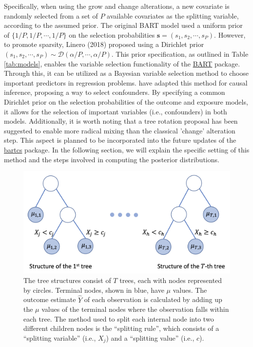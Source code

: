 Specifically, when using the grow and change alterations, a new covariate is randomly selected from a set of $P$ available covariates as the splitting variable, according to the assumed prior. The original BART model used a uniform prior of $\{1/P, 1/P, \cdots, 1/P\}$ on the selection probabilities $\boldsymbol{s} = (s_1, s_2, \cdots, s_P)$. However, to promote sparsity, Linero (2018) proposed using a Dirichlet prior $ (s_1, s_2, \cdots, s_P) \sim \mathcal{D}(\alpha/P, \cdots, \alpha/P)$. This prior specification, as outlined in Table \ref{tab:models}, enables the variable selection functionality of the \href{https://cran.r-project.org/package=BART}{BART} package. Through this, it can be utilized as a Bayesian variable selection method to choose important predictors in regression problems. \cite{kim2023bnp} have adapted this method for causal inference, proposing a way to select confounders. By specifying a common Dirichlet prior on the selection probabilities of the outcome and exposure models, it allows for the selection of important variables (i.e., confounders) in both models. Additionally, it is worth noting that a tree rotation proposal \citep{pratola2016efficient} has been suggested to enable more radical mixing than the classical 'change' alteration step. This aspect is planned to be incorporated into the future updates of the \href{https://CRAN.R-project.org/package=bartcs}{bartcs} package. In the following section, we will explain the specific setting of this method and the steps involved in computing the posterior distributions.

\begin{figure}[htbp]
\centering
\includegraphics[width=0.6\linewidth]{fig/fig1.png}
\caption{The tree structures consist of $T$ trees, each with nodes represented by circles. Terminal nodes, shown in blue, have $\mu$ values. The outcome estimate $\hat{Y}$ of each observation is calculated by adding up the $\mu$ values of the terminal nodes where the observation falls within each tree. The method used to split each internal node into two different children nodes is the ``splitting rule'', which consists of a ``splitting variable'' (i.e., $X_j$) and a ``splitting value'' (i.e., $c$).
}\label{fig:bart}
\end{figure}


